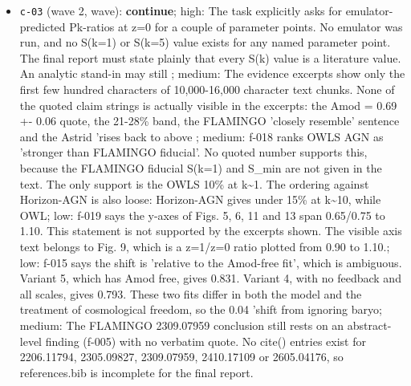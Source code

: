 \documentclass[11pt,a4paper]{article}
\begin{document}
\begin{itemize}
  \item \texttt{c-03} (wave 2, wave): \textbf{continue}; high: The task explicitly asks for emulator-predicted Pk-ratios at z=0 for a couple of parameter points. No emulator was run, and no S(k=1) or S(k=5) value exists for any named parameter point. The final report must state plainly that every S(k) value is a literature value. An analytic stand-in may still ; medium: The evidence excerpts show only the first few hundred characters of 10,000-16,000 character text chunks. None of the quoted claim strings is actually visible in the excerpts: the Amod = 0.69 +- 0.06 quote, the 21-28\% band, the FLAMINGO 'closely resemble' sentence and the Astrid 'rises back to above ; medium: f-018 ranks OWLS AGN as 'stronger than FLAMINGO fiducial'. No quoted number supports this, because the FLAMINGO fiducial S(k=1) and S\_min are not given in the text. The only support is the OWLS 10\% at k\textasciitilde{}1. The ordering against Horizon-AGN is also loose: Horizon-AGN gives under 15\% at k\textasciitilde{}10, while OWL; low: f-019 says the y-axes of Figs. 5, 6, 11 and 13 span 0.65/0.75 to 1.10. This statement is not supported by the excerpts shown. The visible axis text belongs to Fig. 9, which is a z=1/z=0 ratio plotted from 0.90 to 1.10.; low: f-015 says the shift is 'relative to the Amod-free fit', which is ambiguous. Variant 5, which has Amod free, gives 0.831. Variant 4, with no feedback and all scales, gives 0.793. These two fits differ in both the model and the treatment of cosmological freedom, so the 0.04 'shift from ignoring baryo; medium: The FLAMINGO 2309.07959 conclusion still rests on an abstract-level finding (f-005) with no verbatim quote. No cite() entries exist for 2206.11794, 2305.09827, 2309.07959, 2410.17109 or 2605.04176, so references.bib is incomplete for the final report.

\end{itemize}
\end{document}
